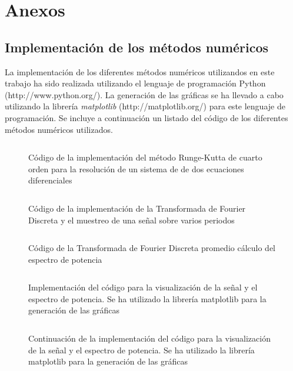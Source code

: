 \documentclass[11pt]{article}
\begin{document}
\pagebreak
\section{Anexos}

\subsection{Implementación de los métodos numéricos}
La implementación de los diferentes métodos numéricos utilizandos en este trabajo ha sido realizada utilizando el lenguaje de programación Python (http://www.python.org/). La generación de las gráficas se ha llevado a cabo utilizando la librería \textit{matplotlib} (http://matplotlib.org/) para este lenguaje de programación. Se incluye a continuación un listado del código de los diferentes métodos numéricos utilizados.

\begin{figure}
\inputminted[firstline=22, lastline=66, fontsize=\footnotesize]{python}{../metodos/eq_diferenciales.py}
\caption{Código de la implementación del método Runge-Kutta de cuarto orden para la resolución de un sistema de de dos ecuaciones diferenciales}
\label{runge_kutta_code}
\end{figure}

\begin{figure}
\inputminted[firstline=1, lastline=41, fontsize=\footnotesize]{python}{../metodos/transformada_fourier.py}
\caption{Código de la implementación de la Transformada de Fourier Discreta y el muestreo de una señal sobre varios periodos}
\end{figure}

\begin{figure}
\inputminted[firstline=43, lastline=83, fontsize=\footnotesize]{python}{../metodos/transformada_fourier.py}
\caption{Código de la Transformada de Fourier Discreta promedio cálculo del espectro de potencia}
\end{figure}

\begin{figure}
\inputminted[firstline=1, lastline=28, fontsize=\footnotesize]{python}{../graficas.py}
\caption{Implementación del código para la visualización de la señal y el espectro de potencia.
Se ha utilizado la librería matplotlib para la generación de las gráficas}
\end{figure}

\begin{figure}
\inputminted[firstline=29, lastline=61, firstnumber=29]{python}{../graficas.py}
\caption{Continuación de la implementación del código para la visualización de la señal y el espectro de potencia.
Se ha utilizado la librería matplotlib para la generación de las gráficas}
\end{figure}
\end{document}
